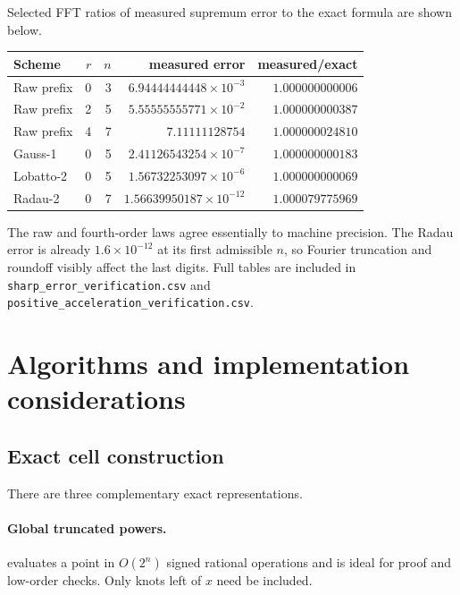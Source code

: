 \documentclass[11pt,oneside]{article}
\numberwithin{equation}{section}
\theoremstyle{definition}
\theoremstyle{remark}
\begin{document}
Selected FFT ratios of measured supremum error to the exact formula are shown below.

\begin{center}
\begin{tabular}{@{}lrrrr@{}}
\toprule
Scheme & $r$ & $n$ & measured error & measured/exact\\
\midrule
Raw prefix & 0 & 3 & $6.94444444448\times10^{-3}$ & $1.000000000006$\\
Raw prefix & 2 & 5 & $5.55555555771\times10^{-2}$ & $1.000000000387$\\
Raw prefix & 4 & 7 & $7.11111128754$ & $1.000000024810$\\
Gauss-1 & 0 & 5 & $2.41126543254\times10^{-7}$ & $1.000000000183$\\
Lobatto-2 & 0 & 5 & $1.56732253097\times10^{-6}$ & $1.000000000069$\\
Radau-2 & 0 & 7 & $1.56639950187\times10^{-12}$ & $1.000079775969$\\
\bottomrule
\end{tabular}
\end{center}

The raw and fourth-order laws agree essentially to machine precision.  The Radau error
is already $1.6\times10^{-12}$ at its first admissible $n$, so Fourier truncation and
roundoff visibly affect the last digits.  Full tables are included in
\texttt{sharp\_error\_verification.csv} and
\texttt{positive\_acceleration\_verification.csv}.

\section{Algorithms and implementation considerations}
\label{p3:sec:algorithms}

\subsection{Exact cell construction}

There are three complementary exact representations.

\paragraph{Global truncated powers.}
 evaluates a point in $O(2^n)$ signed rational %
operations and is ideal for proof and low-order checks.  Only knots left of $x$ need be
included.
\end{document}
